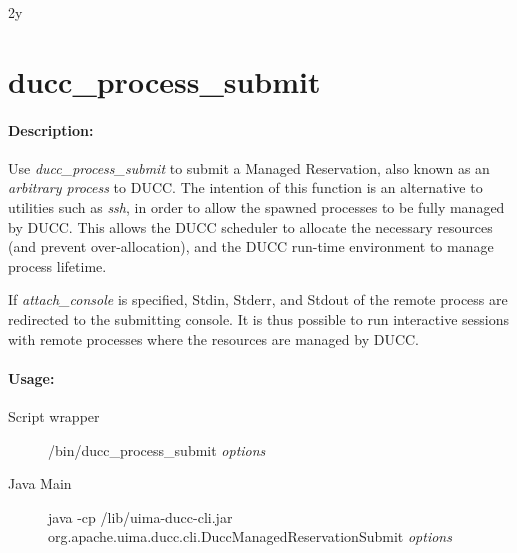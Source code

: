 % 
% 
% 
% 
2y%
\ifpdf
\else
{}
\fi
    \section{ducc\_process\_submit}
    \label{sec:cli.ducc-process-submit}
    \paragraph{Description:}
       Use {\em ducc\_process\_submit} to submit a Managed Reservation, also known as an
       {\em arbitrary process} to DUCC.  The intention
       of this function is an alternative to utilities such as {\em ssh}, in order to allow the
       spawned processes to be fully managed by DUCC.  This allows the DUCC scheduler to allocate
       the necessary resources (and prevent over-allocation), and the DUCC run-time environment
       to manage process lifetime.

       If {\em attach\_console} is specified, Stdin, Stderr, and Stdout of the remote
       process are redirected to the submitting console.  It is thus possible to run interactive
       sessions with remote processes where the resources are managed by DUCC.

    \paragraph{Usage:}
    \begin{description}
    \item[Script wrapper] \ducchome/bin/ducc\_process\_submit {\em options}
    \item[Java Main]      java -cp \ducchome/lib/uima-ducc-cli.jar\\org.apache.uima.ducc.cli.DuccManagedReservationSubmit {\em options}
    \end{description}

